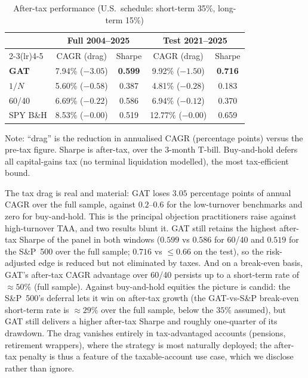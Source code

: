 \begin{table}[H]
\centering
\caption{After-tax performance (U.S.\ schedule: short-term 35\%, long-term 15\%)}
\label{tab:tax}
\small
\begin{tabular}{lcccc}
\toprule
& \multicolumn{2}{c}{Full 2004--2025} & \multicolumn{2}{c}{Test 2021--2025} \\
\cmidrule(lr){2-3}\cmidrule(lr){4-5}
& CAGR (drag) & Sharpe & CAGR (drag) & Sharpe \\
\midrule
\textbf{GAT}  & 7.94\% ($-3.05$) & \textbf{0.599} & 9.92\% ($-1.50$) & \textbf{0.716} \\
$1/N$         & 5.60\% ($-0.58$) & 0.387 & 4.81\% ($-0.28$) & 0.183 \\
60/40         & 6.69\% ($-0.22$) & 0.586 & 6.94\% ($-0.12$) & 0.370 \\
SPY B\&H      & 8.53\% ($-0.00$) & 0.519 & 12.77\% ($-0.00$) & 0.659 \\
\bottomrule
\end{tabular}
\begin{flushleft}
\footnotesize Note: ``drag'' is the reduction in annualised CAGR (percentage points)
versus the pre-tax figure. Sharpe is after-tax, over the 3-month T-bill. Buy-and-hold
defers all capital-gains tax (no terminal liquidation modelled), the most
tax-efficient bound.
\end{flushleft}
\end{table}

The tax drag is real and material: GAT loses $3.05$ percentage points of annual CAGR
over the full sample, against $0.2$--$0.6$ for the low-turnover benchmarks and zero
for buy-and-hold. This is the principal objection practitioners raise against
high-turnover TAA, and two results blunt it. GAT still retains the highest after-tax
Sharpe of the panel in both windows ($0.599$ vs $0.586$ for 60/40 and $0.519$ for the
S\&P~500 over the full sample; $0.716$ vs $\leq 0.66$ on the test), so the
risk-adjusted edge is reduced but not eliminated by taxes. And on a break-even
basis, GAT's after-tax CAGR advantage over 60/40 persists up to a short-term rate of
$\approx 50\%$ (full sample). Against buy-and-hold equities the picture is candid:
the S\&P~500's deferral lets it win on after-tax growth (the GAT-vs-S\&P
break-even short-term rate is $\approx 29\%$ over the full sample, below the $35\%$
assumed), but GAT still delivers a higher after-tax Sharpe and roughly one-quarter of
its drawdown. The drag vanishes entirely in tax-advantaged accounts (pensions,
retirement wrappers), where the strategy is most naturally deployed; the after-tax
penalty is thus a feature of the taxable-account use case, which we disclose rather
than ignore.

